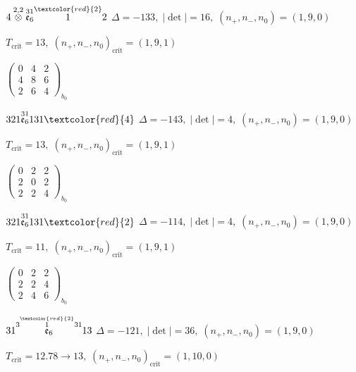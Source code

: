 \documentclass[10pt]{article}
\begin{document}
\smallskip

$4\overset{2,2}{\otimes}\overset{31}{\mathfrak{e}_6}\overset{\textcolor{red}{2}}{1}2$ \quad $\Delta=-133,\; |\det|=16,\; (n_+,n_-,n_0)=(1,9,0)$

\hspace{1em}$T_{\text{crit}}=13,\; (n_+,n_-,n_0)_{\text{crit}}=(1,9,1)$

\hspace{2em}$\left(\begin{smallmatrix}0 & 4 & 2 \\ 4 & 8 & 6 \\ 2 & 6 & 4\end{smallmatrix}\right)_{\!b_0}$

\smallskip

$321\overset{31}{\mathfrak{e}_6}131\textcolor{red}{4}$ \quad $\Delta=-143,\; |\det|=4,\; (n_+,n_-,n_0)=(1,9,0)$

\hspace{1em}$T_{\text{crit}}=13,\; (n_+,n_-,n_0)_{\text{crit}}=(1,9,1)$

\hspace{2em}$\left(\begin{smallmatrix}0 & 2 & 2 \\ 2 & 0 & 2 \\ 2 & 2 & 4\end{smallmatrix}\right)_{\!b_0}$

$321\overset{31}{\mathfrak{e}_6}131\textcolor{red}{2}$ \quad $\Delta=-114,\; |\det|=4,\; (n_+,n_-,n_0)=(1,9,0)$

\hspace{1em}$T_{\text{crit}}=11,\; (n_+,n_-,n_0)_{\text{crit}}=(1,9,1)$

\hspace{2em}$\left(\begin{smallmatrix}0 & 2 & 2 \\ 2 & 2 & 4 \\ 2 & 4 & 6\end{smallmatrix}\right)_{\!b_0}$

\smallskip

$31\overset{3\overset{\textcolor{red}{2}}{1}31}{\mathfrak{e}_6}13$ \quad $\Delta=-121,\; |\det|=36,\; (n_+,n_-,n_0)=(1,9,0)$

\hspace{1em}$T_{\text{crit}}=12.78 \to 13,\; (n_+,n_-,n_0)_{\text{crit}}=(1,10,0)$
\end{document}
